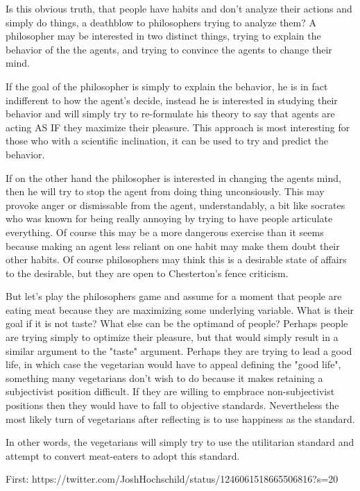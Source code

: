 \documentclass[12pt]{report}
\numberwithin{equation}{section}
\begin{document}
Is this obvious truth, that people have habits and don't analyze their actions and simply do things, a deathblow to philosophers trying to analyze them? A philosopher may be interested in two distinct things, trying to explain the behavior of the the agents, and trying to convince the agents to change their mind. 

If the goal of the philosopher is simply to explain the behavior, he is in fact indifferent to how the agent's decide, instead he is interested in studying their behavior and will simply try to re-formulate his theory to say that agents are acting AS IF they maximize their pleasure. This approach is most interesting for those who with a scientific inclination, it can be used to try and predict the behavior. 

If on the other hand the philosopher is interested in changing the agents mind, then he will try to stop the agent from doing thing unconsiously. This may provoke anger or dismissable from the agent, understandably, a bit like socrates who was known for being really annoying by trying to have people articulate everything. Of course this may be a more dangerous exercise than it seems because making an agent less reliant on one habit may make them doubt their other habits. Of course philosophers may think this is a desirable state of affairs to the desirable, but they are open to Chesterton's fence criticism. 

But let's play the philosophers game and assume for a moment that people are eating meat because they are maximizing some underlying variable. What is their goal if it is not taste? What else can be the optimand of people? Perhaps people are trying simply to optimize their pleasure, but that would simply result in a similar argument to the "taste" argument. Perhaps they are trying to lead a good life, in which case the vegetarian would have to appeal defining the "good life", something many vegetarians don't wish to do because it makes retaining a subjectivist position difficult. If they are willing to empbrace non-subjectivist positions then they would have to fall to objective standards. Nevertheless the most likely turn of vegetarians after reflecting is to use happiness as the standard. 

In other words, the vegetarians will simply try to use the utilitarian standard and attempt to convert meat-eaters to adopt this standard. 

First: https://twitter.com/JoshHochschild/status/1246061518665506816?s=20
\end{document}
